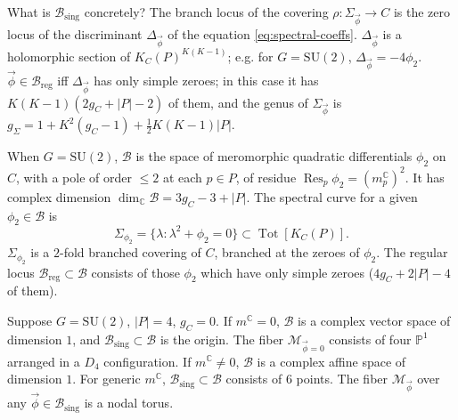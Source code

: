 \documentclass[12pt,letterpaper,reqno]{article}
\numberwithin{equation}{section}
\newcommand{\cB}{\ensuremath{\mathcal B}}
\newcommand{\cM}{\ensuremath{\mathcal M}}
\newcommand{\C}{\ensuremath{\mathbb C}}
\newcommand{\bbP}{\ensuremath{\mathbb P}}
\newcommand{\half}{\ensuremath{\frac{1}{2}}}
\newcommand{\sing}{\mathrm{sing}}
\newcommand{\reg}{\mathrm{reg}}
\newcommand{\abs}[1]{\lvert#1\rvert}
\newcommand{\vphi}{{\vec\phi}}
\DeclareMathOperator{\Res}{Res}
\DeclareMathOperator{\Tot}{Tot}
\newcommand{\SU}{\mathrm{SU}}
\newcommand{\insfig}[2]{

\medskip
\noindent
\begin{minipage}{\linewidth}

\makebox[\linewidth]{\texttt{[image: figures/\#1-crop.pdf]}}

\end{minipage}
\medskip

}
\begin{document}
\begin{defn}

\begin{remark}
What is $\cB_\sing$ concretely?
The branch locus of the covering $\rho: \Sigma_\vphi \to C$ 
is the zero locus of the discriminant $\Delta_{\vphi}$ of the equation \eqref{eq:spectral-coeffs}. $\Delta_\vphi$ 
is a holomorphic section of $K_C(P)^{K(K-1)}$;
e.g. for $G = \SU(2)$,
$\Delta_{\vphi} = - 4 \phi_2$.
$\vphi \in \cB_\reg$ iff $\Delta_\vphi$ has only simple zeroes; in this case
it has $K(K-1)(2g_C+\abs{P}-2)$ of them, and the genus of $\Sigma_\vphi$ is
  $g_\Sigma = 1 + K^2(g_C - 1) + \half K(K-1) \abs{P}$.
\end{remark}

\begin{example}[Hitchin base and spectral curves for $G = \SU(2)$]
When $G = \SU(2)$, $\cB$ is the space of meromorphic quadratic
differentials $\phi_2$ on $C$, with a pole of order $\le 2$ at 
each $p \in P$, of residue $\Res_p \phi_2 = (m_p^\C)^2$.
It has complex dimension
$\dim_\C \cB = 3 g_C - 3 + \abs{P}$. 
The spectral curve for a given $\phi_2 \in \cB$
is
\begin{equation}
  \Sigma_{\phi_2} = \{\lambda: \lambda^2 + \phi_2 = 0\} \subset \Tot[K_C(P)].
\end{equation}
$\Sigma_{\phi_2}$ is a $2$-fold branched covering of $C$, branched at the zeroes of $\phi_2$.
The regular locus $\cB_\reg \subset \cB$ consists of those $\phi_2$ which have only simple zeroes ($4 g_C + 2\abs{P} - 4$ of them).
\end{example}
\end{defn}


\begin{example}
Suppose $G = \SU(2)$, $\abs{P} = 4$, $g_C = 0$.
If $m^\C = 0$, $\cB$ is a complex vector space of dimension $1$,
and $\cB_\sing \subset \cB$ is the origin.
The fiber $\cM_{\vphi =0}$ consists of four $\bbP^1$
arranged in a $D_4$ configuration.
If $m^\C \neq 0$, $\cB$ is a complex affine space of dimension $1$.
For generic $m^\C$, $\cB_\sing \subset \cB$ consists
of $6$ points. The fiber $\cM_\vphi$ over any $\vphi \in \cB_\sing$ is
a nodal torus.
\end{example}

\insfig{higgs-metric-2}{0.85}
\end{document}

